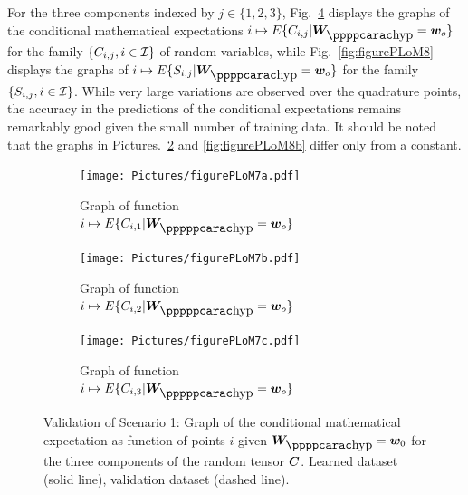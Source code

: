 For the three components indexed by $j\in\{1,2,3\}$, Fig.~\ref{fig:figurePLoM7} displays the graphs of the conditional mathematical expectations 
$i\mapsto E\{ C_{i,j} \vert \bfW_\hypp = \bfw_o \}$  for the family  $\{C_{i,j},i\in{\mathcal{I}}\}$ of random variables, while Fig.~\ref{fig:figurePLoM8} displays the graphs of $i\mapsto E\{ S_{i,j} \vert \bfW_\hypp = \bfw_o \}$  for the family  $\{S_{i,j},i\in{\mathcal{I}}\}$. While very large variations are observed over the quadrature points, the accuracy in the predictions of the conditional expectations remains remarkably good given the small number of training data. It should be noted that the graphs in Pictures.~\ref{fig:figurePLoM7b} and \ref{fig:figurePLoM8b} differ only from a constant.\\
\begin{figure}[!htb]
    \begin{center}
        \begin{subfigure}[b]{0.32\textwidth}
            \begin{center}
                \texttt{[image: Pictures/figurePLoM7a.pdf]}
            \end{center}
                \caption{Graph of function $i\mapsto E\{ C_{i,1} \vert \bfW_\hyppp = \bfw_o \}$}
                \label{fig:figurePLoM7a}
            \end{subfigure}
            \begin{subfigure}[b]{0.32\textwidth}
                \begin{center}
                    \texttt{[image: Pictures/figurePLoM7b.pdf]}
                \end{center}
                \caption{Graph of function $i\mapsto E\{ C_{i,2} \vert \bfW_\hyppp = \bfw_o \}$}
                \label{fig:figurePLoM7b}
            \end{subfigure}
            \begin{subfigure}[b]{0.32\textwidth}
                \begin{center}
                    \texttt{[image: Pictures/figurePLoM7c.pdf]}
                \end{center}
                \caption{Graph of function $i\mapsto E\{ C_{i,3} \vert \bfW_\hyppp = \bfw_o \}$}
                \label{fig:figurePLoM7c}
            \end{subfigure}
    \end{center}
    \caption[Validation of Scenario 1: Graph of the conditional mathematical expectation as function of points $i$ given $\bfW_\hypp =\bfw_0$.]{Validation of Scenario 1: Graph of the conditional mathematical expectation as function of points $i$ given $\bfW_\hypp =\bfw_0$ for the three components of the random tensor ${\boldsymbol{C}}$.  Learned dataset (solid line), validation dataset (dashed line).}
    \label{fig:figurePLoM7}
\end{figure}
